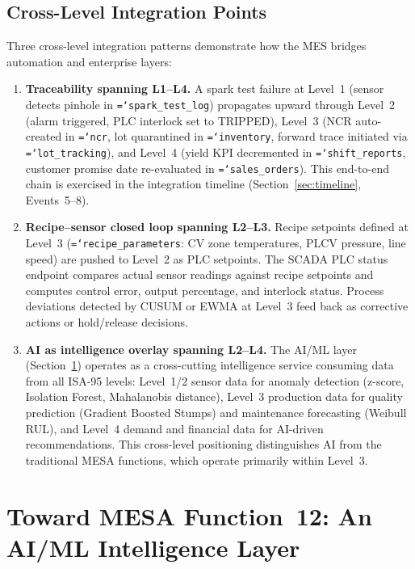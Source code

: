 \documentclass[11pt]{article}
\newcommand{\tfield}[1]{\texttt{\hyphenchar\font=`\-\relax #1}}
\begin{document}
\subsection{Cross-Level Integration Points}

Three cross-level integration patterns demonstrate how the MES bridges automation and enterprise layers:

\begin{enumerate}[leftmargin=2em, itemsep=2pt]
\item \textbf{Traceability spanning L1--L4.}  A spark test failure at Level~1 (sensor detects pinhole in \tfield{spark\_test\_log}) propagates upward through Level~2 (alarm triggered, PLC interlock set to TRIPPED), Level~3 (NCR auto-created in \tfield{ncr}, lot quarantined in \tfield{inventory}, forward trace initiated via \tfield{lot\_tracking}), and Level~4 (yield KPI decremented in \tfield{shift\_reports}, customer promise date re-evaluated in \tfield{sales\_orders}).  This end-to-end chain is exercised in the integration timeline (Section~\ref{sec:timeline}, Events~5--8).

\item \textbf{Recipe--sensor closed loop spanning L2--L3.}  Recipe setpoints defined at Level~3 (\tfield{recipe\_parameters}: CV zone temperatures, PLCV pressure, line speed) are pushed to Level~2 as PLC setpoints.  The SCADA PLC status endpoint compares actual sensor readings against recipe setpoints and computes control error, output percentage, and interlock status.  Process deviations detected by CUSUM or EWMA at Level~3 feed back as corrective actions or hold/release decisions.

\item \textbf{AI as intelligence overlay spanning L2--L4.}  The AI/ML layer (Section~\ref{sec:mesa12}) operates as a cross-cutting intelligence service consuming data from all ISA-95 levels: Level~1/2 sensor data for anomaly detection (z-score, Isolation Forest, Mahalanobis distance), Level~3 production data for quality prediction (Gradient Boosted Stumps) and maintenance forecasting (Weibull RUL), and Level~4 demand and financial data for AI-driven recommendations.  This cross-level positioning distinguishes AI from the traditional MESA functions, which operate primarily within Level~3.
\end{enumerate}


\section{Toward MESA Function~12: An AI/ML Intelligence Layer}\label{sec:mesa12}
\end{document}

